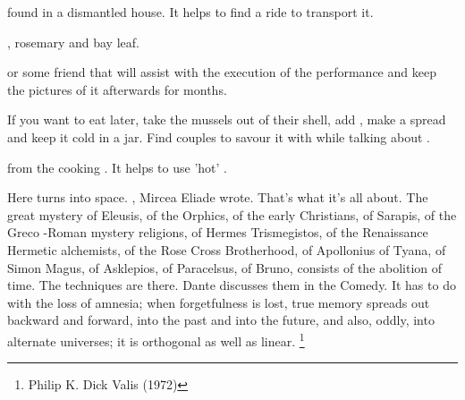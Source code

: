 {{

\column

\startitemize[3,unpacked]

\item{ found in a dismantled house. It helps to find a ride to transport
it.}

\item{}

\item{}

\item{, rosemary and bay leaf.}

\item{ or some  friend that will assist with the execution of
the performance and keep the pictures of it afterwards for months.}

\stopitemize


If you want to eat later, take the mussels out of their
shell, add , make a spread and keep it cold in a jar. Find
 couples to savour it with  while talking about .

\column

\startitemize[3,unpacked]

\item{}

\item{}

\item{}

\item{ from the cooking . It helps to use
'hot' .
}
\stopitemize

Here  turns into space. , Mircea Eliade
wrote. That's what it's all about.
\blank
The great mystery of Eleusis, of the Orphics, of the early Christians,
of Sarapis, of the Greco {}-Roman mystery religions, of Hermes
Trismegistos, of the Renaissance Hermetic alchemists, of the Rose Cross
Brotherhood, of Apollonius of Tyana, of Simon Magus, of Asklepios, of
Paracelsus, of Bruno, consists of the abolition of time. The techniques
are there. Dante discusses them in the Comedy. It has to do with the
loss of amnesia; when forgetfulness is lost, true memory spreads out
backward and forward, into the past and into the future, and also,
oddly, into alternate universes; it is orthogonal as well as linear.
\footnote{Philip K. Dick Valis (1972)} 

}

\stopcolumns

}

\setupcaptions[style=\tfxx\setupinterlinespace,number=no,location=bottom,width=1.45cm,align=middle]
